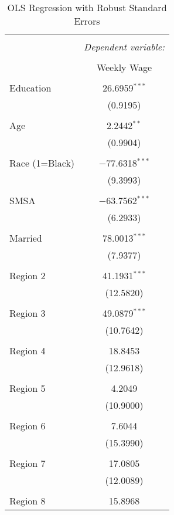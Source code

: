 \documentclass[
]{article}
\begin{document}
\begin{table}[!htbp] \centering 
  \caption{OLS Regression with Robust Standard Errors} 
  \label{} 
\begin{tabular}{@{\extracolsep{5pt}}lc} 
\\[-1.8ex]\hline 
\hline \\[-1.8ex] 
 & \multicolumn{1}{c}{\textit{Dependent variable:}} \\ 
\cline{2-2} 
\\[-1.8ex] & Weekly Wage \\ 
\hline \\[-1.8ex] 
 Education & 26.6959$^{***}$ \\ 
  & (0.9195) \\ 
  & \\ 
 Age & 2.2442$^{**}$ \\ 
  & (0.9904) \\ 
  & \\ 
 Race (1=Black) & $-$77.6318$^{***}$ \\ 
  & (9.3993) \\ 
  & \\ 
 SMSA & $-$63.7562$^{***}$ \\ 
  & (6.2933) \\ 
  & \\ 
 Married & 78.0013$^{***}$ \\ 
  & (7.9377) \\ 
  & \\ 
 Region 2 & 41.1931$^{***}$ \\ 
  & (12.5820) \\ 
  & \\ 
 Region 3 & 49.0879$^{***}$ \\ 
  & (10.7642) \\ 
  & \\ 
 Region 4 & 18.8453 \\ 
  & (12.9618) \\ 
  & \\ 
 Region 5 & 4.2049 \\ 
  & (10.9000) \\ 
  & \\ 
 Region 6 & 7.6044 \\ 
  & (15.3990) \\ 
  & \\ 
 Region 7 & 17.0805 \\ 
  & (12.0089) \\ 
  & \\ 
 Region 8 & 15.8968 \\ 

\end{tabular}
\end{table}
\end{document}
